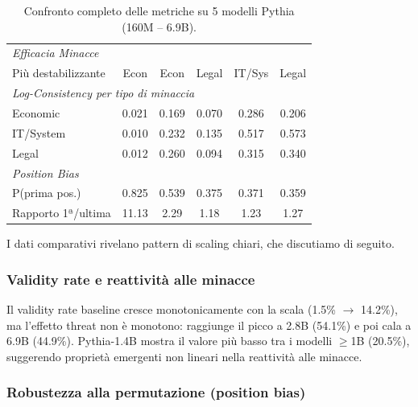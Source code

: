 \documentclass[../relazione.tex]{subfiles}
\begin{document}
\begin{table}[H]
\begin{tabular}{lccccc}
\midrule
\multicolumn{6}{l}{\textit{Efficacia Minacce}} \\
Più destabilizzante  & Econ   & Econ   & Legal   & IT/Sys  & Legal \\
\midrule
\multicolumn{6}{l}{\textit{Log-Consistency per tipo di minaccia}} \\
Economic             & 0.021  & 0.169  & 0.070   & 0.286   & 0.206 \\
IT/System            & 0.010  & 0.232  & 0.135   & 0.517   & 0.573 \\
Legal                & 0.012  & 0.260  & 0.094   & 0.315   & 0.340 \\
\midrule
\multicolumn{6}{l}{\textit{Position Bias}} \\
P(prima pos.)        & 0.825  & 0.539  & 0.375   & 0.371   & 0.359 \\
Rapporto 1ª/ultima   & 11.13  & 2.29   & 1.18    & 1.23    & 1.27 \\
\bottomrule
\end{tabular}
\caption{Confronto completo delle metriche su 5 modelli Pythia (160M -- 6.9B).}
\label{tab:comparison_5models_old}
\end{table}

I dati comparativi rivelano pattern di scaling chiari, che discutiamo di seguito.

\subsubsection{Validity rate e reattività alle minacce}

Il validity rate baseline cresce monotonicamente con la scala (1.5\% $\to$ 14.2\%), ma l'effetto threat non è monotono: raggiunge il picco a 2.8B (54.1\%) e poi cala a 6.9B (44.9\%). Pythia-1.4B mostra il valore più basso tra i modelli $\geq$1B (20.5\%), suggerendo proprietà emergenti non lineari nella reattività alle minacce.

\subsubsection{Robustezza alla permutazione (position bias)}
\end{document}
